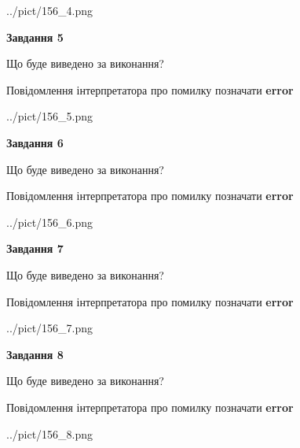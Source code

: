 \documentclass[12pt, ukrainian]{article}
\begin{document}
{\begin{center}
	{../pict/156_4.png}
\end{center}
\newpage

{\begin {center}\textbf{Завдання 5}\end {center}}\par
Що буде виведено за виконання? \par
Повідомлення інтерпретатора про помилку позначати \textbf{error}

\begin{center}
	{../pict/156_5.png}
\end{center}
\newpage

{\begin {center}\textbf{Завдання 6}\end {center}}\par
Що буде виведено за виконання? \par
Повідомлення інтерпретатора про помилку позначати \textbf{error}

\begin{center}
	{../pict/156_6.png}
\end{center}
\newpage

{\begin {center}\textbf{Завдання 7}\end {center}}\par
Що буде виведено за виконання? \par
Повідомлення інтерпретатора про помилку позначати \textbf{error}

\begin{center}
	{../pict/156_7.png}
\end{center}
\newpage

{\begin {center}\textbf{Завдання 8}\end {center}}\par
Що буде виведено за виконання? \par
Повідомлення інтерпретатора про помилку позначати \textbf{error}

\begin{center}
	{../pict/156_8.png}
\end{center}
\newpage

}
\end{document}
